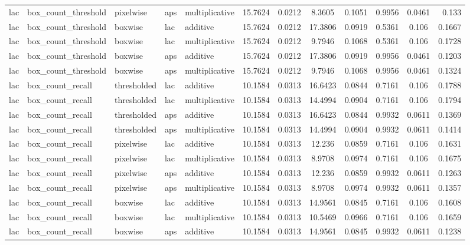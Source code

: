 \begin{table*}[htbp]
\begin{tabular}{@{}lllll rrcrrcr@{}}
lac & box\_count\_threshold & pixelwise & aps & multiplicative & 15.7624 & 0.0212 & 8.3605 & 0.1051 & 0.9956 & 0.0461 & 0.133 \\
lac & box\_count\_threshold & boxwise & lac & additive & 15.7624 & 0.0212 & 17.3806 & 0.0919 & 0.5361 & 0.106 & 0.1667 \\
lac & box\_count\_threshold & boxwise & lac & multiplicative & 15.7624 & 0.0212 & 9.7946 & 0.1068 & 0.5361 & 0.106 & 0.1728 \\
lac & box\_count\_threshold & boxwise & aps & additive & 15.7624 & 0.0212 & 17.3806 & 0.0919 & 0.9956 & 0.0461 & 0.1203 \\
lac & box\_count\_threshold & boxwise & aps & multiplicative & 15.7624 & 0.0212 & 9.7946 & 0.1068 & 0.9956 & 0.0461 & 0.1324 \\
lac & box\_count\_recall & thresholded & lac & additive & 10.1584 & 0.0313 & 16.6423 & 0.0844 & 0.7161 & 0.106 & 0.1788 \\
lac & box\_count\_recall & thresholded & lac & multiplicative & 10.1584 & 0.0313 & 14.4994 & 0.0904 & 0.7161 & 0.106 & 0.1794 \\
lac & box\_count\_recall & thresholded & aps & additive & 10.1584 & 0.0313 & 16.6423 & 0.0844 & 0.9932 & 0.0611 & 0.1369 \\
lac & box\_count\_recall & thresholded & aps & multiplicative & 10.1584 & 0.0313 & 14.4994 & 0.0904 & 0.9932 & 0.0611 & 0.1414 \\
lac & box\_count\_recall & pixelwise & lac & additive & 10.1584 & 0.0313 & 12.236 & 0.0859 & 0.7161 & 0.106 & 0.1631 \\
lac & box\_count\_recall & pixelwise & lac & multiplicative & 10.1584 & 0.0313 & 8.9708 & 0.0974 & 0.7161 & 0.106 & 0.1675 \\
lac & box\_count\_recall & pixelwise & aps & additive & 10.1584 & 0.0313 & 12.236 & 0.0859 & 0.9932 & 0.0611 & 0.1263 \\
lac & box\_count\_recall & pixelwise & aps & multiplicative & 10.1584 & 0.0313 & 8.9708 & 0.0974 & 0.9932 & 0.0611 & 0.1357 \\
lac & box\_count\_recall & boxwise & lac & additive & 10.1584 & 0.0313 & 14.9561 & 0.0845 & 0.7161 & 0.106 & 0.1608 \\
lac & box\_count\_recall & boxwise & lac & multiplicative & 10.1584 & 0.0313 & 10.5469 & 0.0966 & 0.7161 & 0.106 & 0.1659 \\
lac & box\_count\_recall & boxwise & aps & additive & 10.1584 & 0.0313 & 14.9561 & 0.0845 & 0.9932 & 0.0611 & 0.1238 \\

\end{tabular}
\end{table*}
